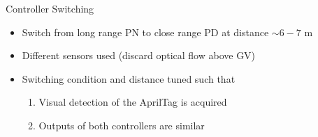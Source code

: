 \begin{frame}{Controller Switching}
	\begin{itemize}
	\item Switch from long range PN to close range PD at distance $\sim 6-7$ m
	\vspace{0.5cm}
	\item Different sensors used (discard optical flow above GV)
	\vspace{0.5cm}
	\item Switching condition and distance tuned such that
	\begin{enumerate}
		\item Visual detection of the AprilTag is acquired
		\item Outputs of both controllers are similar
	\end{enumerate}
	\end{itemize}
	
\end{frame}

